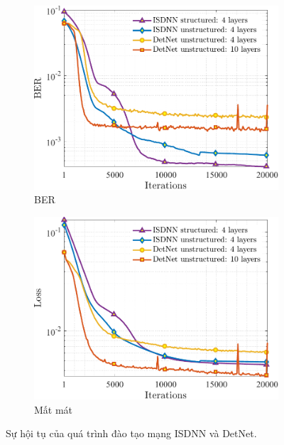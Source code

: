 \begin{figure}[t]
     \centering
     \begin{subfigure}[b]{0.48\textwidth}
         \centering
         \includegraphics[width=\textwidth]{figures/BER_1.pdf}
         \caption{BER}
         \label{fig:ber_1}
     \end{subfigure}
     \hfill
     \begin{subfigure}[b]{0.48\textwidth}
         \centering
         \includegraphics[width=\textwidth]{figures/Loss_1.pdf}
         \caption{Mất mát}
         \label{fig:loss_1}
     \end{subfigure}
     \hfill
        \caption{Sự hội tụ của quá trình đào tạo mạng ISDNN và DetNet.}
        \label{fig:training_1}
\end{figure}
